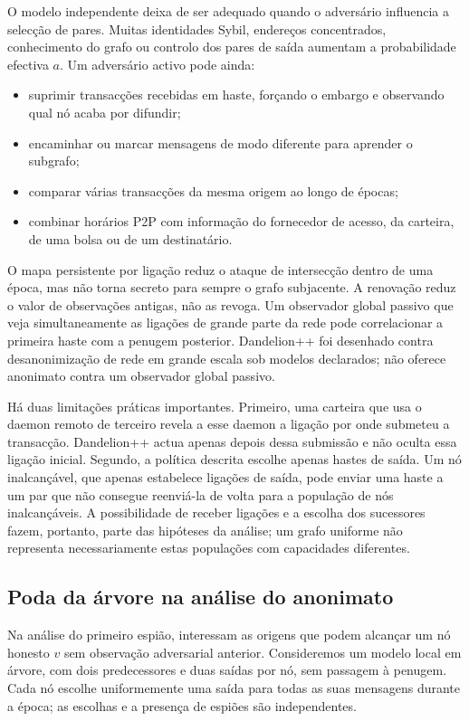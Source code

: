 O modelo independente deixa de ser adequado quando o adversário influencia a
selecção de pares. Muitas identidades Sybil, endereços concentrados,
conhecimento do grafo ou controlo dos pares de saída aumentam a probabilidade
efectiva \(a\).
Um adversário activo pode ainda:
\begin{itemize}
 \item suprimir transacções recebidas em haste, forçando o embargo e observando
 qual nó acaba por difundir;
 \item encaminhar ou marcar mensagens de modo diferente para aprender o
 subgrafo;
 \item comparar várias transacções da mesma origem ao longo de épocas;
 \item combinar horários P2P com informação do fornecedor de acesso, da
 carteira, de uma bolsa ou de um destinatário.
\end{itemize}

O mapa persistente por ligação reduz o ataque de intersecção dentro de uma
época, mas não torna secreto para sempre o grafo subjacente. A renovação reduz
o valor de observações antigas, não as revoga. Um observador global passivo que
veja simultaneamente as ligações de grande parte da rede pode correlacionar a
primeira haste com a penugem posterior. Dandelion++ foi desenhado contra
desanonimização de rede em grande escala sob modelos declarados; não oferece
anonimato contra um observador global passivo.

Há duas limitações práticas importantes. Primeiro, uma carteira que usa o
daemon remoto de terceiro revela a esse daemon a ligação por onde submeteu a
transacção. Dandelion++ actua apenas depois dessa submissão e não oculta essa
ligação inicial. Segundo, a política descrita escolhe apenas hastes de saída.
Um nó inalcançável, que apenas estabelece ligações de saída, pode enviar
uma haste a um par que não consegue reenviá-la de volta para a população de
nós inalcançáveis. A possibilidade de receber ligações e a escolha dos
sucessores fazem, portanto, parte das hipóteses da análise; um grafo uniforme
não representa necessariamente estas populações com capacidades diferentes.


\subsection{Poda da árvore na análise do anonimato}
\label{subsec:dandelion-tree-pruning}

Na análise do primeiro espião, interessam as origens que podem alcançar um
nó honesto \(v\) sem observação adversarial anterior. Consideremos um modelo
local em árvore, com dois predecessores e duas saídas por nó, sem passagem à
penugem. Cada nó escolhe uniformemente uma saída para todas as suas mensagens
durante a época; as escolhas e a presença de espiões são independentes.

